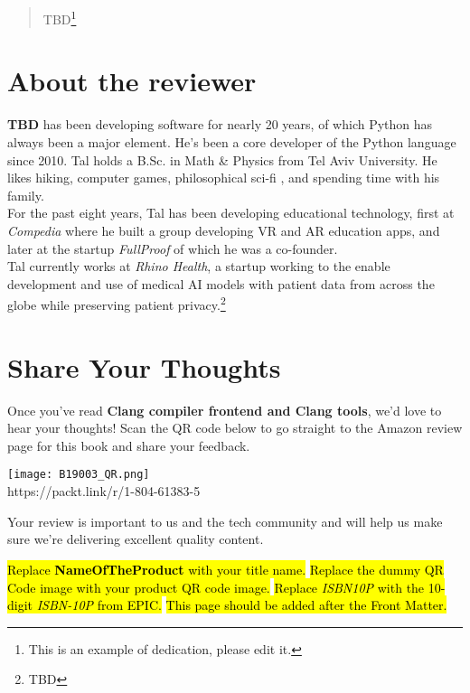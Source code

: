 \begin{flushleft}
\begin{quote}
    TBD\footnote{This is an example of dedication, please edit it.}
\end{quote}


\vspace{0.2 cm}

\section*{About the reviewer}
\textbf {TBD} has been developing software for nearly 20 years, of which Python has always been a major element. He's been a core developer of the Python language since 2010. Tal holds a B.Sc. in Math \& Physics from Tel Aviv University. He likes hiking, computer games, philosophical sci-fi , and spending time with his family.\\
\vspace{0.15 cm}
For the past eight years, Tal has been developing educational technology, first at \textit{Compedia} where he built a group developing VR and AR education apps, and later at the startup \textit{FullProof} of which he was a co-founder.\\
\vspace{0.15 cm}
Tal currently works at \textit{Rhino Health}, a startup working to the enable development and use of medical AI models with patient data from across the globe while preserving patient privacy.\footnote{TBD}


\section*{Share Your Thoughts}
Once you’ve read \textbf {Clang compiler frontend and Clang tools}, we’d love to hear your thoughts! Scan the QR code below to go straight to the Amazon review page for this book and share your feedback.

\begin{center}
\texttt{[image: B19003\_QR.png]}\\
\small{https://packt.link/r/1-804-61383-5}
\end{center}

Your review is important to us and the tech community and will help us make sure we’re delivering excellent quality content.


\hl{Replace \textbf{NameOfTheProduct} with your title name.}
\newline
\hl{Replace the dummy QR Code image with your product QR code image.}
\newline
\hl{Replace \textit{ISBN10P} with the 10-digit \textit{ISBN-10P} from EPIC.}
\newline
\hl{This page should be added after the Front Matter.}

\end{flushleft}

\clearpage

